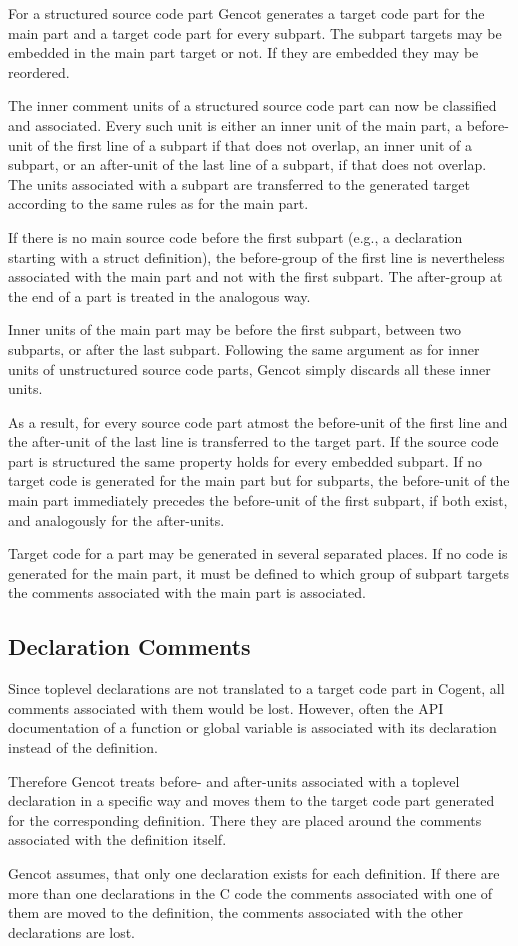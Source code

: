 For a structured source code part Gencot generates a target code part for the main part and a target code part for every 
subpart. The subpart targets may be embedded in the main part target or not. If they are embedded they may be reordered.

The inner comment units of a structured source code part can now be classified and associated. Every such unit is either
an inner unit of the main part, a before-unit of the first line of a subpart if that does not overlap, an inner 
unit of a subpart, or an after-unit of the last line of a subpart, if that does not overlap. The units associated with a subpart
are transferred to the generated target according to the same rules as for the main part. 

If there is no main source code before the first subpart (e.g., a declaration starting with a struct definition), the
before-group of the first line is nevertheless associated with the main part and not with the first subpart. The after-group
at the end of a part is treated in the analogous way.

Inner units of the main part may be before the first subpart, between two subparts, or after the last subpart. Following 
the same argument as for inner units of unstructured source code parts, Gencot simply discards all these inner units.

As a result, for every source code part atmost the before-unit of the first line and the after-unit of the last line 
is transferred to the target part. If the source code part is structured the same property holds for every embedded 
subpart. If no target code is generated for the main part but for subparts, the before-unit of the main part immediately
precedes the before-unit of the first subpart, if both exist, and analogously for the after-units.

Target code for a part may be generated in several separated places. If no code
is generated for the main part, it must be defined to which group of subpart targets the comments associated with the
main part is associated.

\subsection{Declaration Comments}

Since toplevel declarations are not translated to a target code part in Cogent, all comments associated with them would
be lost. However, often the API documentation of a function or global variable is associated with its declaration instead of the
definition. 

Therefore Gencot treats before- and after-units associated with a toplevel declaration in a specific way and 
moves them to the target code part generated for the corresponding definition. There they are placed around 
the comments associated with the definition itself. 

Gencot assumes, that only one declaration exists for each definition. If there are more than one declarations 
in the C code the comments associated with one of them are moved to the definition, the comments associated with
the other declarations are lost. 

 
